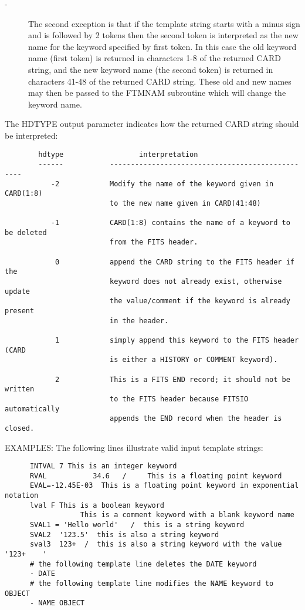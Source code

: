 \documentclass[11pt]{book}
\begin{document}
\begin{description}
\item[- ]     The second exception is that if the template string starts with
        a minus sign and is followed by 2 tokens then the second token
        is interpreted as the new name for the keyword specified by
        first token.  In this case the old keyword name (first token)
        is returned in characters 1-8 of the returned CARD string, and
        the new keyword name (the second token) is returned in characters
        41-48 of the returned CARD string.  These old and new names
        may then be passed to the FTMNAM subroutine which will change
       the keyword name.
\end{description}

    The HDTYPE output parameter indicates how the returned CARD string
    should be interpreted:

\begin{verbatim}
        hdtype                  interpretation
        ------           -------------------------------------------------
           -2            Modify the name of the keyword given in CARD(1:8)
                         to the new name given in CARD(41:48)

           -1            CARD(1:8) contains the name of a keyword to be deleted
                         from the FITS header.

            0            append the CARD string to the FITS header if the
                         keyword does not already exist, otherwise update
                         the value/comment if the keyword is already present
                         in the header.

            1            simply append this keyword to the FITS header (CARD
                         is either a HISTORY or COMMENT keyword).

            2            This is a FITS END record; it should not be written
                         to the FITS header because FITSIO automatically
                         appends the END record when the header is closed.
\end{verbatim}
     EXAMPLES:  The following lines illustrate valid input template strings:

\begin{verbatim}
      INTVAL 7 This is an integer keyword
      RVAL           34.6   /     This is a floating point keyword
      EVAL=-12.45E-03  This is a floating point keyword in exponential notation
      lval F This is a boolean keyword
                  This is a comment keyword with a blank keyword name
      SVAL1 = 'Hello world'   /  this is a string keyword
      SVAL2  '123.5'  this is also a string keyword
      sval3  123+  /  this is also a string keyword with the value '123+    '
      # the following template line deletes the DATE keyword
      - DATE
      # the following template line modifies the NAME keyword to OBJECT
      - NAME OBJECT
\end{verbatim}

\end{document}
